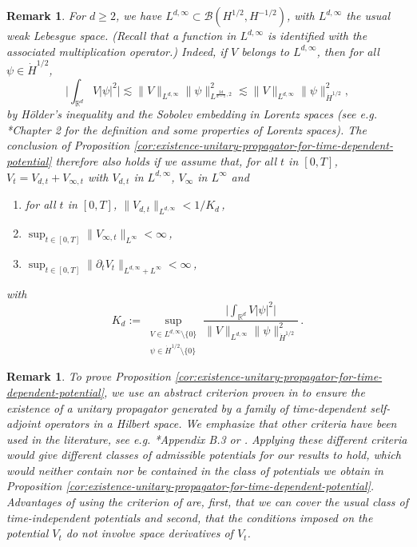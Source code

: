 \documentclass[12pt]{article}
\theoremstyle{plain}
\newtheorem{rem}[theo]{Remark}
\begin{document}
\begin{rem}
    For $d\ge2$, we have $L^{d,\infty}\subset \mathcal{B}(H^{1/2},H^{-1/2})$, with $L^{d,\infty}$ the usual weak Lebesgue space. (Recall that  a function in $L^{d,\infty}$ is identified with the associated multiplication operator.) Indeed, if $V$ belongs to $L^{d,\infty}$, then for all $\psi\in\dot{H}^{1/2}$,
    \begin{equation*}
    \Big|\int_{\mathbb{R}^d}V|\psi|^2\Big| 
    \lesssim \|V\|_{L^{d,\infty}} \|\psi\|_{L^{\frac{2d}{d-1},2}}^2
   \lesssim \|V\|_{L^{d,\infty}} \|\psi\|_{\dot{H}^{1/2}}^2,
   \end{equation*}
   by Hölder's inequality and the Sobolev embedding in Lorentz spaces (see e.g. \cite{LemarieRieusset}*{Chapter 2} for the definition and some properties of Lorentz spaces). The conclusion of Proposition \ref{cor:existence-unitary-propagator-for-time-dependent-potential} therefore also holds if we assume that, for all $t$ in $[0,T]$, $V_t=V_{d,t}+V_{\infty,t}$ with $V_{d,t}$ in $L^{d,\infty}$, $V_\infty$ in $L^\infty$ and
   \begin{enumerate}
    \item \label{item:borne-Vd-rk} for all $t$ in $[0,T]$, $\|V_{d,t}\|_{L^{d,\infty}} <1/K_d$\,, 
    \item \label{item:borne-Vinfty-rk} $\sup_{t\in [0,T]}\|V_{\infty,t}\|_{L^\infty}<\infty$\,,
    \item \label{item:borne-dtV-rk}$ \sup_{t\in [0,T]}\|\partial_t V_t\|_{L^{d,\infty}+L^\infty} < \infty$\,,
\end{enumerate}
with
\begin{equation*}
K_d:=\sup_{\substack{V\in L^{d,\infty}\setminus\{0\}\\\psi \in \dot{H}^{1/2}\setminus\{0\}}} \frac{ \big|\int_{\mathbb{R}^d}V|\psi|^2\big|}{\|V\|_{L^{d,\infty}} \|\psi\|_{\dot{H}^{1/2}}^2}\,.
\end{equation*}
\end{rem}

\begin{rem}
To prove Proposition \ref{cor:existence-unitary-propagator-for-time-dependent-potential}, we use an abstract criterion proven in \cite{AmmariBreteaux} to ensure the existence of a unitary propagator generated by a family of time-dependent self-adjoint operators in a Hilbert space. We emphasize that other criteria have been used in the literature, see e.g. \cite{derezinski_ger}*{Appendix B.3} or \cite[Chapter 5]{Pazy}. Applying these different criteria would give different classes of admissible potentials for our results to hold, which would neither contain nor be contained in the class of potentials we obtain in Proposition \ref{cor:existence-unitary-propagator-for-time-dependent-potential}. Advantages of using the criterion of \cite{AmmariBreteaux} are, first, that we can cover the usual class of time-independent potentials and second, that the conditions imposed on the potential $V_t$ do not involve space derivatives of $V_t$.
\end{rem}
\end{document}
